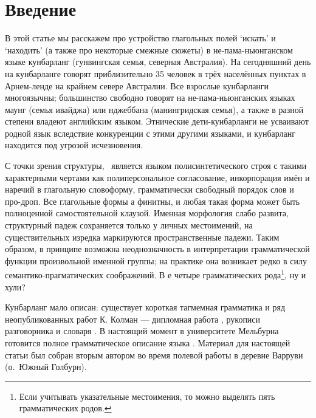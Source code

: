 \section{Введение}
В этой статье мы расскажем про устройство глагольных полей `искать' и `находить' (а также про некоторые смежные сюжеты) в не-пама-ньюнганском языке кунбарланг (гунвингская семья, северная Австралия). На сегодняшний день на кунбарланге говорят приблизительно 35 человек в трёх населённых пунктах в Арнем-ленде на крайнем севере Австралии. Все взрослые кунбарланги многоязычны; большинство свободно говорят на не-пама-ньюнганских языках маунг (семья ивайджа) или нджеббана (манингридская семья), а также в разной степени владеют английским языком. Этнические дети-кунбарланги не усваивают родной язык вследствие конкуренции с этими другими языками, и кунбарланг находится под угрозой исчезновения.

С точки зрения структуры, \ является языком полисинтетического строя с такими характерными чертами как полиперсональное согласование, инкорпорация имён и наречий в глагольную словоформу, грамматически свободный порядок слов и про-дроп. Все глагольные формы  а финитны, и любая такая форма может быть полноценной самостоятельной клаузой. Именная морфология слабо развита, структурный падеж сохраняется только у личных местоимений, на существительных изредка маркируются пространственные падежи. Таким образом, в принципе возможна неоднозначность в интерпретации грамматической функции произвольной именной группы; на практике она возникает редко в силу семантико-прагматических соображений. %
В  е четыре грамматических рода\footnote{Если учитывать указательные местоимения, то можно выделять пять грамматических родов.}, ну и хули? %

Кунбарланг мало описан: существует короткая тагмемная грамматика \cite{harris69} и ряд неопубликованных работ К. Колман --- дипломная работа \cite{coleman82}, рукописи разговорника \parencite{wordgra} и словаря \parencite{coleman10}. В настоящий момент в университете Мельбурна готовится полное грамматическое описание языка \parencite{ikwlg}. 
Материал для настоящей статьи был собран вторым автором во время полевой работы в деревне Варруви (о.\ Южный Голбурн). %

